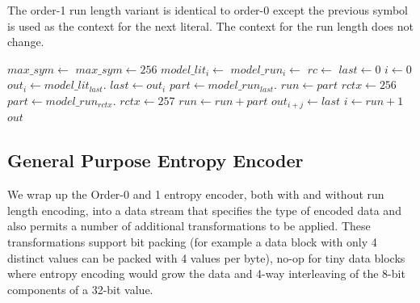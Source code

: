 \documentclass[a4paper]{article}
\begin{document}
The order-1 run length variant is identical to order-0 except the
previous symbol is used as the context for the next literal.  The
context for the run length does not change.

\begin{algorithmic}[1]
  \State $max\_sym \gets $
    \State $max\_sym \gets 256$
  \EndIf
    \State $model\_lit_i \gets $
  \EndFor
    \State $model\_run_i \gets $
  \EndFor
  \Statex
  \State $rc \gets $
  \State $last \gets 0$
  \State $i \gets 0$
    \State $out_i \gets model\_lit_{last}.$
    \State $last \gets out_i$
    \State $part \gets model\_run_{last}.$
    \State $run \gets part$
    \State $rctx \gets 256$
      \State $part \gets model\_run_{rctx}.$
      \State $rctx \gets 257$
      \State $run \gets run + part$
    \EndWhile
      \State $out_{i+j} \gets last$
    \EndFor
    \State $i \gets run+1$
  \EndWhile
  \State \Return $out$
\EndFunction
\end{algorithmic}

\subsection{General Purpose Entropy Encoder}

We wrap up the Order-0 and 1 entropy encoder, both with and without run length encoding, into a data stream that specifies the type of encoded data and also permits a number of additional transformations to be applied.
These transformations support bit packing (for example a data block with only 4 distinct values can be packed with 4 values per byte), no-op for tiny data blocks where entropy encoding would grow the data and 4-way interleaving of the 8-bit components of a 32-bit value.
\end{document}

